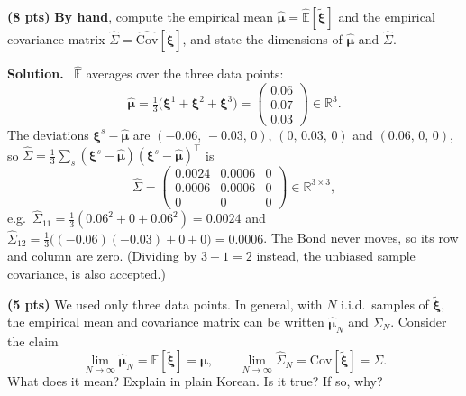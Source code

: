 \documentclass[10pt]{article}
\newenvironment{solution}
  {\par\smallskip\begingroup\color{solink}\textbf{Solution.}\ }
  {\par\endgroup}
\begin{document}
\begin{parts}
\item \textbf{(8 pts)} \textbf{By hand}, compute the empirical mean $\widehat{\bm{\mu}} = \widehat{\mathbb{E}}[\tilde{\bm{\xi}}]$ and the
  empirical covariance matrix $\widehat{\Sigma} = \widehat{\mathrm{Cov}}[\tilde{\bm{\xi}}]$, and state the dimensions of $\widehat{\bm{\mu}}$ and $\widehat{\Sigma}$.

\begin{solution}
$\widehat{\mathbb{E}}$ averages over the three data points:
\[
  \widehat{\bm{\mu}} = \tfrac13\big(\bm{\xi}^1 + \bm{\xi}^2 + \bm{\xi}^3\big)
      = \begin{pmatrix} 0.06 \\ 0.07 \\ 0.03 \end{pmatrix} \in \mathbb{R}^3 .
\]
The deviations $\bm{\xi}^s - \widehat{\bm{\mu}}$ are $(-0.06,\, -0.03,\, 0)$, $(0,\, 0.03,\, 0)$ and $(0.06,\, 0,\, 0)$, so
$\widehat{\Sigma} = \tfrac13 \sum_s (\bm{\xi}^s - \widehat{\bm{\mu}})(\bm{\xi}^s - \widehat{\bm{\mu}})^{\top}$ is
\[
  \widehat{\Sigma} = \begin{pmatrix}
    0.0024 & 0.0006 & 0 \\
    0.0006 & 0.0006 & 0 \\
    0      & 0      & 0
  \end{pmatrix} \in \mathbb{R}^{3 \times 3},
\]
e.g.\ $\widehat{\Sigma}_{11} = \tfrac13(0.06^2 + 0 + 0.06^2) = 0.0024$ and
$\widehat{\Sigma}_{12} = \tfrac13\big((-0.06)(-0.03) + 0 + 0\big) = 0.0006$.
The Bond never moves, so its row and column are zero.
(Dividing by $3 - 1 = 2$ instead, the unbiased sample covariance, is also accepted.)
\end{solution}

\item \textbf{(5 pts)} We used only three data points. In general, with $N$ i.i.d.\ samples of $\tilde{\bm{\xi}}$, the empirical mean and
  covariance matrix can be written $\widehat{\bm{\mu}}_N$ and $\widehat{\Sigma}_N$. Consider the claim
  \[
    \lim_{N \to \infty} \widehat{\bm{\mu}}_N = \mathbb{E}[\tilde{\bm{\xi}}] = \bm{\mu}, \qquad
    \lim_{N \to \infty} \widehat{\Sigma}_N = \mathrm{Cov}[\tilde{\bm{\xi}}] = \Sigma .
  \]
  What does it mean? Explain in plain Korean. Is it true? If so, why?


\end{parts}
\end{document}
